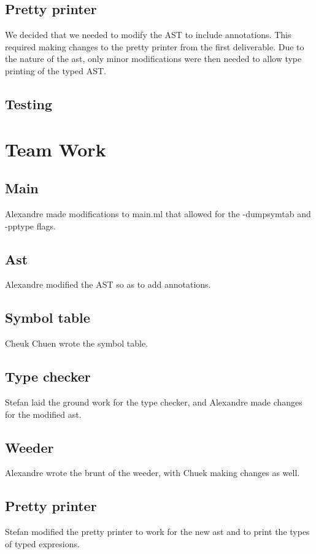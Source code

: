 \documentclass{article}
\begin{document}
\subsection*{Pretty printer}
We decided that we needed to modify the AST to include annotations. This required making changes to the pretty printer from the first deliverable. Due to the nature of the ast, only minor modifications were then needed to allow type printing of the typed AST.

\subsection*{Testing}

\section*{Team Work}
\subsection*{Main}
Alexandre made modifications to main.ml that allowed for the -dumpsymtab and -pptype flags.

\subsection*{Ast}
Alexandre modified the AST so as to add annotations.

\subsection*{Symbol table}
Cheuk Chuen wrote the symbol table.

\subsection*{Type checker}
Stefan laid the ground work for the type checker, and Alexandre made changes for the modified ast.

\subsection*{Weeder}
Alexandre wrote the brunt of the weeder, with Chuek making changes as well.

\subsection*{Pretty printer}
Stefan modified the pretty printer to work for the new ast and to print the types of typed expresions.
\end{document}
